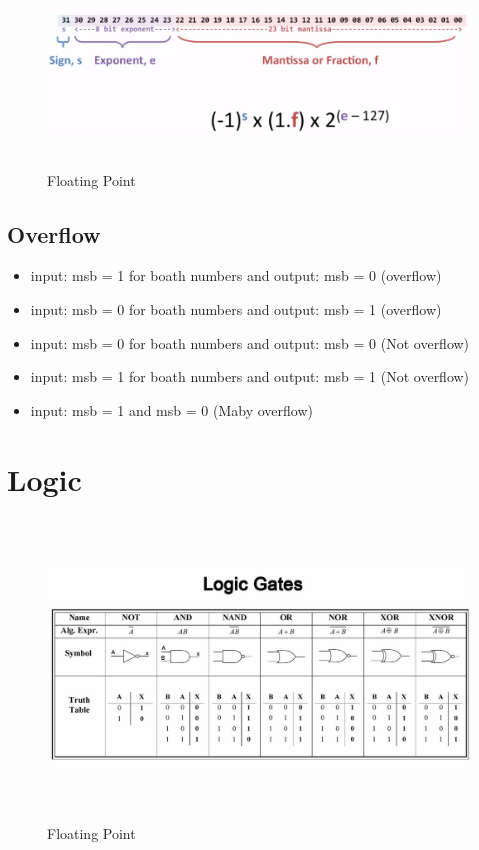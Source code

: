\begin{figure}[h]
    \vspace{10mm}
    \centering
    \includegraphics[width=16cm, height=5cm]{image/floating-point.png} 
    \caption{Floating Point}
    \label{floating-point}
\end{figure}

\subsection{Overflow}
\begin{itemize}
\item  input: msb = 1 for boath numbers and output: msb = 0 (overflow)
\item  input: msb = 0 for boath numbers and output: msb = 1 (overflow)
\item  input: msb = 0 for boath numbers and output: msb = 0 (Not overflow)
\item  input: msb = 1 for boath numbers and output: msb = 1 (Not overflow)
\item  input: msb = 1 and msb = 0 (Maby overflow)
\end{itemize}


\newpage

\section{Logic}

\begin{figure}[h]
    \vspace{10mm}
    \centering
    \includegraphics[width=16cm, height=8cm]{image/logic-gates.jpeg} 
    \caption{Floating Point}
    \label{logic-gates}
\end{figure}

